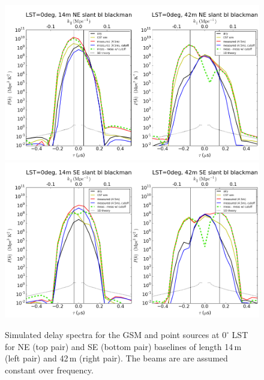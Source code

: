 \documentclass{emulateapj}
\begin{document}
\begin{figure}[h]
\includegraphics[width=6.7in]{LST0deg_14m_42m_NEslantbaselines_dish1_blackman.png}
\includegraphics[width=6.7in]{LST0deg_14m_42m_SEslantbaselines_dish1_blackman.png}
\caption{Simulated delay spectra for the GSM and point sources at $0^\circ$ LST for NE (top pair) and SE (bottom pair) baselines of length 14\,m (left pair) and 42\,m (right pair). The beams are are assumed constant over frequency.}
\label{fig:delayspec2}
\end{figure}







\end{document}
